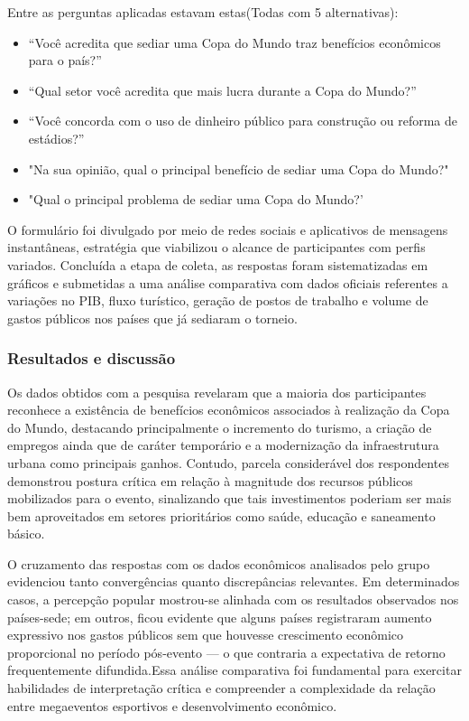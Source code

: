 \documentclass[12pt, a4paper, brazil]{article}
\begin{document}
Entre as perguntas aplicadas estavam estas(Todas com 5 alternativas):
\begin{itemize}
\item “Você acredita que sediar uma Copa do Mundo traz benefícios econômicos para o país?” 

\item “Qual setor você acredita que mais lucra durante a Copa do Mundo?” 

\item “Você concorda com o uso de dinheiro público para construção ou reforma de estádios?” 

\item "Na sua opinião, qual o principal benefício de sediar uma Copa do Mundo?" 

\item "Qual o principal problema de sediar uma Copa do Mundo?' 
\end{itemize}

O formulário foi divulgado por meio de redes sociais e aplicativos de mensagens instantâneas, estratégia que viabilizou o alcance de participantes com perfis variados. Concluída a etapa de coleta, as respostas foram sistematizadas em gráficos e submetidas a uma análise comparativa com dados oficiais referentes a variações no PIB, fluxo turístico, geração de postos de trabalho e volume de gastos públicos nos países que já sediaram o torneio.

\subsubsection{Resultados e discussão}
Os dados obtidos com a pesquisa revelaram que a maioria dos participantes reconhece a existência de benefícios econômicos associados à realização da Copa do Mundo, destacando principalmente o incremento do turismo, a criação de empregos ainda que de caráter temporário e a modernização da infraestrutura urbana como principais ganhos. Contudo, parcela considerável dos respondentes demonstrou postura crítica em relação à magnitude dos recursos públicos mobilizados para o evento, sinalizando que tais investimentos poderiam ser mais bem aproveitados em setores prioritários como saúde, educação e saneamento básico.

O cruzamento das respostas com os dados econômicos analisados pelo grupo evidenciou tanto convergências quanto discrepâncias relevantes. Em determinados casos, a percepção popular mostrou-se alinhada com os resultados observados nos países-sede; em outros, ficou evidente que alguns países registraram aumento expressivo nos gastos públicos sem que houvesse crescimento econômico proporcional no período pós-evento — o que contraria a expectativa de retorno frequentemente difundida.Essa análise comparativa foi fundamental para exercitar habilidades de interpretação crítica e compreender a complexidade da relação entre megaeventos esportivos e desenvolvimento econômico.
\end{document}
